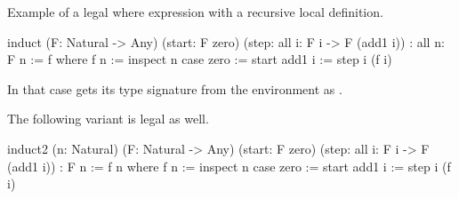 Example of a legal where expression with a recursive local definition.
\begin{alba}
    induct
        (F: Natural -> Any)
        (start: F zero)
        (step: all i: F i -> F (add1 i))
        : all n: F n
    :=
        f where
            f n :=
                inspect n case
                    zero :=
                        start
                    add1 i :=
                        step i (f i)
\end{alba}
In that case  gets its type signature from the environment as .

The following variant is legal as well.
\begin{alba}
    induct2
        (n: Natural)
        (F: Natural -> Any)
        (start: F zero)
        (step: all i: F i -> F (add1 i))
        : F n
    :=
        f n where
            f n :=
                inspect n case
                    zero :=
                        start
                    add1 i :=
                        step i (f i)
\end{alba}












